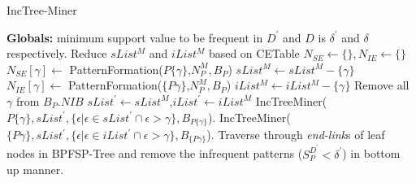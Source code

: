 \begin{algorithm}[!thb]
      \scriptsize %
      \caption{IncTree-Miner}
      \label{algorithm:inc_tree_miner}
       \begin{algorithmic}[1]
       \State \textbf{Globals: }minimum support value to be frequent in $D^{\prime}$ and $D$ is $\delta^{\prime}$ and $\delta$ respectively.
            \State Reduce $sList^{M}$ and $iList^{M}$ based on CETable
            \State  {}
            \State $N_{SE} \gets \{\},N_{IE} \gets \{\}$
            \State {}
                \State $N_{SE}[\gamma] \gets $ PatternFormation($P\{\gamma\}$,$N_{P}^{M},B_{P}$)
                \State {}
                 $sList^{M} \gets sList^{M}-\{\gamma\}$
                \EndIf
            \EndFor
            \State {}
                \State $N_{IE}[\gamma] \gets $ PatternFormation($\{P\gamma\}$,$N_{P}^{M},B_{P}$)
                \State {}
                  $iList^{M} \gets iList^{M}-\{\gamma\}$
                \EndIf
            \EndFor
            \State {}
                \State Remove all $\gamma$ from $B_{P}.NIB$
            \EndIf
            \State {}
            \State $sList^{\prime} \gets sList^{M}$,$iList^{\prime} \gets iList^{M}$
            \State {}
                \State IncTreeMiner($P\{\gamma\},sList^{\prime},\{ \epsilon \vert \epsilon \in sList^{\prime} \cap \epsilon>\gamma \},B_{P\{\gamma\}}$).
            \EndFor
            \State {}
                \State IncTreeMiner($\{P\gamma\},sList^{\prime},\{ \epsilon \vert \epsilon \in iList^{\prime} \cap \epsilon>\gamma \},B_{\{P\gamma\}}$).
            \EndFor
        \EndProcedure
            \State Traverse through \textit{end-link}s of leaf nodes in BPFSP-Tree and remove the infrequent patterns ($S_{P}^{D^{\prime}} < \delta^{\prime}$) in bottom up manner.
        \EndProcedure
       \end{algorithmic}
\end{algorithm}

